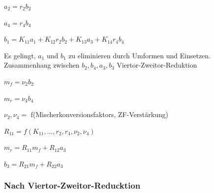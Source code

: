 \begin{pitemize}
    \item $a_2 = r_2 b_2$
    \item $a_4 = r_4 b_4$
\end{pitemize}

\begin{pitemize}
    \item $b_1 = K_{11} a_1 + K_{12} r_2 b_2 + K_{13} a_3 + K_{14} r_4b_4$
\end{pitemize}
Es gelingt, $a_1$ und $b_1$ zu eliminieren durch Umformen und Einsetzen.
Zusammenhang zwischen $b_2, b_4, a_3, b_3$
Viertor-Zweitor-Reduktion

\begin{pitemize}
    \item $m_f = \nu_2 b_2$
    \item $m_r = \nu_4 b_4$
    \item $\nu_2,\nu_4 = $ f(Mischerkonversionsfaktors, ZF-Verstärkung) 
    \item $R_{11} = f(K_{11}, ..., r_2, r_4, \nu_2, \nu_4)$
\end{pitemize}


\begin{pitemize}
    \item $m_r = R_{11}m_f + R_{12} a_3$
    \item $b_3 = R_{21} m_f + R_{22} a_3$
\end{pitemize}



\subsubsection{Nach Viertor-Zweitor-Reducktion}


